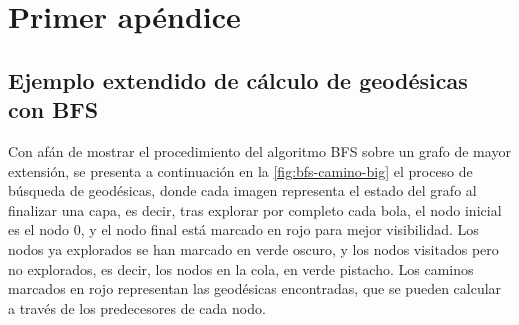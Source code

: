 
\chapter{Primer apéndice}\label{ap:apendice1}

\section{Ejemplo extendido de cálculo de geodésicas con BFS}

Con afán de mostrar el procedimiento del algoritmo BFS sobre un grafo de mayor extensión, se presenta a continuación en la \autoref{fig:bfs-camino-big} el proceso de búsqueda de geodésicas, donde cada imagen representa el estado del grafo al finalizar una capa, es decir, tras explorar por completo cada bola, el nodo inicial es el nodo $0$, y el nodo final está marcado en rojo para mejor visibilidad. Los nodos ya explorados se han marcado en verde oscuro, y los nodos visitados pero no explorados, es decir, los nodos en la cola, en verde pistacho. Los caminos marcados en rojo representan las geodésicas encontradas, que se pueden calcular a través de los predecesores de cada nodo.

